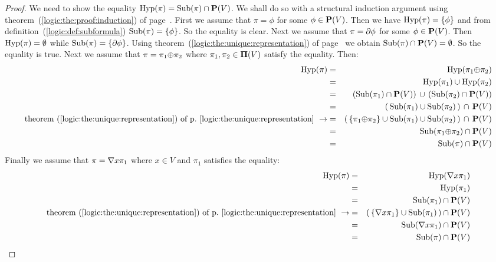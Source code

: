 \begin{proof}
We need to show the equality $\mbox{\rm Hyp}(\pi)=\mbox{\rm Sub}(\pi)\cap\mbox{${\bf P}(V)$}$. We shall
do so with a structural induction argument using
theorem~(\ref{logic:the:proof:induction}) of
page~\pageref{logic:the:proof:induction}. First we assume that
$\pi=\phi$ for some $\phi\in\mbox{${\bf P}(V)$}$. Then we have $\mbox{\rm Hyp}(\pi)=\{\phi\}$
and from definition~(\ref{logic:def:subformula})
$\mbox{\rm Sub}(\pi)=\{\phi\}$. So the equality is clear. Next we assume that
$\pi=\mbox{$\partial$}\phi$ for some $\phi\in\mbox{${\bf P}(V)$}$. Then $\mbox{\rm Hyp}(\pi)=\emptyset$
while $\mbox{\rm Sub}(\pi)=\{\mbox{$\partial$}\phi\}$. Using
theorem~(\ref{logic:the:unique:representation}) of
page~\pageref{logic:the:unique:representation} we obtain
$\mbox{\rm Sub}(\pi)\cap\mbox{${\bf P}(V)$}=\emptyset$. So the equality is true. Next we
assume that $\pi=\pi_{1}\mbox{$\oplus$}\pi_{2}$ where $\pi_{1},\pi_{2}\in\mbox{${\bf\Pi}(V)$}$
satisfy the equality. Then:
    \begin{eqnarray*}
    \hyp(\pi)&=&\hyp(\pi_{1}\pon\pi_{2})\\
    &=&\hyp(\pi_{1})\cup\hyp(\pi_{2})\\
    &=&(\subf(\pi_{1})\cap\pv)\,\cup\,(\subf(\pi_{2})\cap\pv)\\
    &=&(\,\subf(\pi_{1})\cup\subf(\pi_{2})\,)\,\cap\,\pv\\
    \mbox{theorem~(\ref{logic:the:unique:representation})
    of p.~\pageref{logic:the:unique:representation}}\ \rightarrow
    &=&(\,\{\pi_{1}\pon\pi_{2}\}\cup\subf(\pi_{1})\cup\subf(\pi_{2})\,)\,\cap\,\pv\\
    &=&\subf(\pi_{1}\pon\pi_{2})\cap\pv\\
    &=&\subf(\pi)\cap\pv
    \end{eqnarray*}
Finally we assume that $\pi=\mbox{$\nabla$} x\pi_{1}$ where $x\in V$ and
$\pi_{1}$ satisfies the equality:
    \begin{eqnarray*}
    \hyp(\pi)&=&\hyp(\gen x\pi_{1})\\
    &=&\hyp(\pi_{1})\\
    &=&\subf(\pi_{1})\cap\pv\\
    \mbox{theorem~(\ref{logic:the:unique:representation})
    of p.~\pageref{logic:the:unique:representation}}\ \rightarrow
    &=&(\,\{\gen x\pi_{1}\}\cup\subf(\pi_{1})\,)\cap\pv\\
    &=&\subf(\gen x\pi_{1})\cap\pv\\
    &=&\subf(\pi)\cap\pv
    \end{eqnarray*}
\end{proof}

